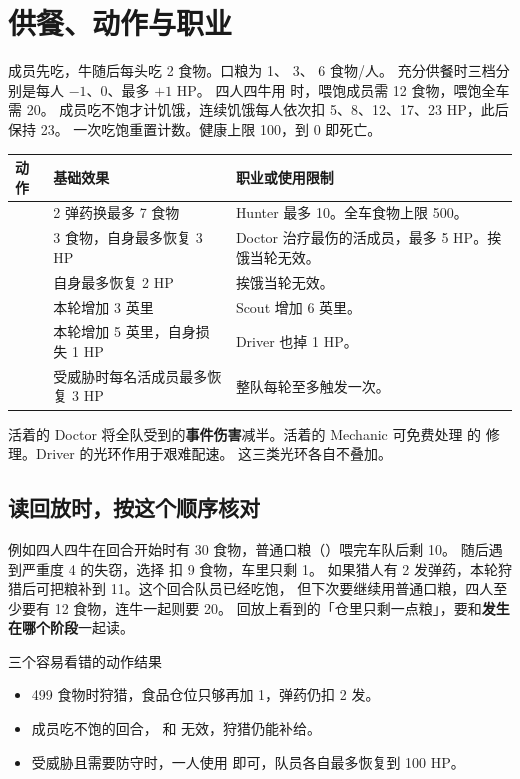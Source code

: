 \documentclass[UTF8,11pt,a4paper]{ctexart}
\begin{document}
\clearpage
\section{供餐、动作与职业}

成员先吃，牛随后每头吃 2 食物。口粮为  1、 3、 6 食物/人。
充分供餐时三档分别是每人 $-1$、$0$、最多 $+1$ HP。
四人四牛用  时，喂饱成员需 12 食物，喂饱全车需 20。
成员吃不饱才计饥饿，连续饥饿每人依次扣 5、8、12、17、23 HP，此后保持 23。
一次吃饱重置计数。健康上限 100，到 0 即死亡。   

\begin{center}\small
\begin{tabularx}{\linewidth}{@{}L{2.5cm}Y Y@{}}
\toprule
动作 & 基础效果 & 职业或使用限制 \\
\midrule
{} & 2 弹药换最多 7 食物 & Hunter 最多 10。全车食物上限 500。 \\
 & 3 食物，自身最多恢复 3 HP & Doctor 治疗最伤的活成员，最多 5 HP。挨饿当轮无效。 \\
 & 自身最多恢复 2 HP & 挨饿当轮无效。 \\
 & 本轮增加 3 英里 & Scout 增加 6 英里。 \\
 & 本轮增加 5 英里，自身损失 1 HP & Driver 也掉 1 HP。 \\
 & 受威胁时每名活成员最多恢复 3 HP & 整队每轮至多触发一次。 \\
\bottomrule
\end{tabularx}
\end{center}
活着的 Doctor 将全队受到的\textbf{事件伤害}减半。活着的 Mechanic 可免费处理
 的  修理。Driver 的光环作用于艰难配速。
这三类光环各自不叠加。  

\subsection{读回放时，按这个顺序核对}

例如四人四牛在回合开始时有 30 食物，普通口粮（）喂完车队后剩 10。
随后遇到严重度 4 的失窃，选择  扣 9 食物，车里只剩 1。
如果猎人有 2 发弹药，本轮狩猎后可把粮补到 11。这个回合队员已经吃饱，
但下次要继续用普通口粮，四人至少要有 12 食物，连牛一起则要 20。
回放上看到的「仓里只剩一点粮」，要和\textbf{发生在哪个阶段}一起读。 

\begin{keybox}{三个容易看错的动作结果}
\begin{itemize}
  \item 499 食物时狩猎，食品仓位只够再加 1，弹药仍扣 2 发。
  \item 成员吃不饱的回合， 和  无效，狩猎仍能补给。
  \item 受威胁且需要防守时，一人使用  即可，队员各自最多恢复到 100 HP。
\end{itemize}
\end{keybox}
\end{document}
